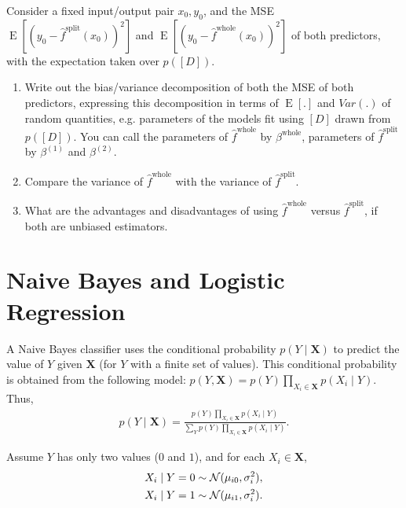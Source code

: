 \documentclass[11pt]{article}
\renewcommand{\vec}[1]{\mathbf{#1}}
\DeclareMathOperator{\E}{E}
\begin{document}
Consider a fixed input/output pair $x_0,y_0$, and the MSE $\E[(y_0 - \hat{f}^{\text{split}}(x_0))^2]$ and $\E[(y_0 - \hat{f}^{\text{whole}}(x_0))^2]$ of both predictors, with the expectation taken over $p([D])$.
\begin{enumerate}
\item Write out the bias/variance decomposition of both the MSE of both predictors, expressing this decomposition in terms of $\E[.]$ and $Var(.)$ of random quantities, e.g. parameters of the models fit using $[D]$ drawn from $p([D])$.  You can call the parameters of $\hat{f}^{\text{whole}}$ by $\beta^{\text{whole}}$, parameters of $\hat{f}^{\text{split}}$ by $\beta^{(1)}$ and $\beta^{(2)}$.

\begin{answertext}{5cm}{}  
\end{answertext} 

\item Compare the variance of $\hat{f}^{\text{whole}}$ with the variance of $\hat{f}^{\text{split}}$.\\
\begin{answertext}{5cm}{}
\end{answertext} 

\pagebreak 

\item What are the advantages and disadvantages of using $\hat{f}^{\text{whole}}$ versus $\hat{f}^{\text{split}}$, if both are unbiased estimators.\\
\begin{answertext}{5cm}{}
\end{answertext} 
\end{enumerate}

\pagebreak
\section{Naive Bayes and Logistic Regression}

A Naive Bayes classifier uses the conditional probability $p(Y \mid \vec{X})$ to predict the value of $Y$ given $\vec{X}$ (for $Y$ with a finite set of values).
This conditional probability is obtained from the following model: $p(Y, \vec{X}) = p(Y) \prod_{X_i \in \vec{X}} p(X_i \mid Y)$.
Thus,
\begin{align*}
p(Y \mid \vec{X}) =
\frac{
p(Y) \prod_{X_i \in \vec{X}} p(X_i \mid Y)
}{
\sum_Y p(Y) \prod_{X_i \in \vec{X}} p(X_i \mid Y)
}.
\end{align*}

Assume $Y$ has only two values ($0$ and $1$), and for each $X_i \in \vec{X}$,
\begin{align*}
X_i \mid Y=0 &\sim {\cal N}(\mu_{i0}, \sigma_i^2),\\
X_i \mid Y=1 &\sim {\cal N}(\mu_{i1}, \sigma_i^2).
\end{align*}
\end{document}
